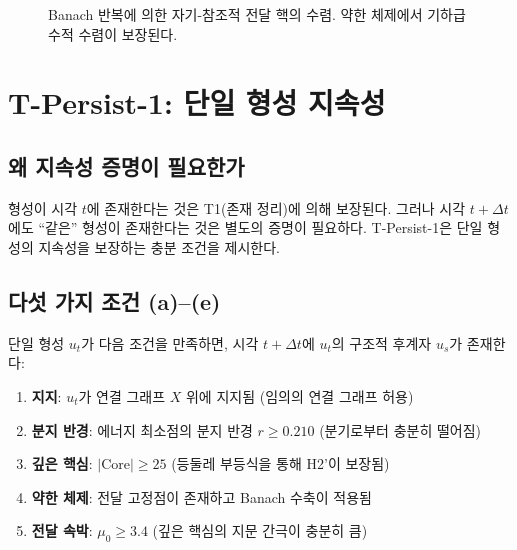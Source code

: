 \begin{figure}[t]
\centering
{}
\caption{Banach 반복에 의한 자기-참조적 전달 핵의 수렴. 약한 체제에서 기하급수적 수렴이 보장된다.}
\label{fig:fixed-point-convergence}
\end{figure}


\section{T-Persist-1: 단일 형성 지속성}
\label{sec:t-persist-1}

\subsection{왜 지속성 증명이 필요한가}

형성이 시각 $t$에 존재한다는 것은 T1(존재 정리)에 의해 보장된다. 그러나 시각 $t+\Delta t$에도 ``같은'' 형성이 존재한다는 것은 별도의 증명이 필요하다. T-Persist-1은 단일 형성의 지속성을 보장하는 충분 조건을 제시한다.

\subsection{다섯 가지 조건 (a)--(e)}

\begin{theorem}[T-Persist-1]
\label{thm:t-persist-1}
단일 형성 $u_t$가 다음 조건을 만족하면, 시각 $t + \Delta t$에 $u_t$의 구조적 후계자 $u_s$가 존재한다:

\begin{enumerate}
    \item[\textbf{(a)}] \textbf{지지}: $u_t$가 연결 그래프 $X$ 위에 지지됨 (임의의 연결 그래프 허용)

    \item[\textbf{(b)}] \textbf{분지 반경}: 에너지 최소점의 분지 반경 $r \geq 0.210$ (분기로부터 충분히 떨어짐)

    \item[\textbf{(c)}] \textbf{깊은 핵심}: $|\mathrm{Core}| \geq 25$ (등둘레 부등식을 통해 H2'이 보장됨)

    \item[\textbf{(d)}] \textbf{약한 체제}: 전달 고정점이 존재하고 Banach 수축이 적용됨

    \item[\textbf{(e)}] \textbf{전달 속박}: $\mu_0 \geq 3.4$ (깊은 핵심의 지문 간극이 충분히 큼)
\end{enumerate}
\end{theorem}

